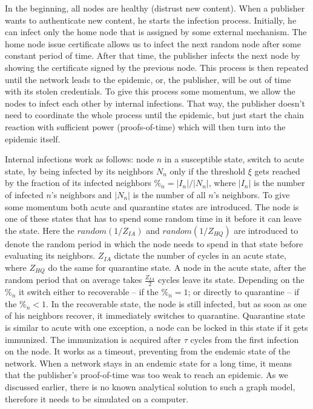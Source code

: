 \documentclass[nostrict]{szablonPG}
\begin{document}
In the beginning, all nodes are healthy (distrust new content). When a publisher wants to authenticate new content, he starts the infection process. Initially, he can infect only the home node that is assigned by some external mechanism. The home node issue certificate allows us to infect the next random node after some constant period of time. After that time, the publisher infects the next node by showing the certificate signed by the previous node. This process is then repeated until the network leads to the epidemic, or, the publisher, will be out of time with its stolen credentials. To give this process some momentum, we allow the nodes to infect each other by internal infections. That way, the publisher doesn't need to coordinate the whole process until the epidemic, but just start the chain reaction with sufficient power (proofs-of-time) which will then turn into the epidemic itself.

Internal infections work as follows: node $n$ in a susceptible state, switch to acute state, by being infected by its neighbors $N_n$ only if the threshold $\xi$ gets reached by the fraction of its infected neighbors $\%_n = |I_n|/|N_n|$, where $|I_n|$ is the number of infected $n$'s neighbors and $|N_n|$ is the number of all $n$'s neighbors. To give some momentum both acute and quarantine states are introduced. The node is one of these states that has to spend some random time in it before it can leave the state. Here the $random(1/Z_{IA})$ and $random(1/Z_{HQ})$ are introduced to denote the random period in which the node needs to spend in that state before evaluating its neighbors. $Z_{IA}$ dictate the number of cycles in an acute state, where $Z_{HQ}$ do the same for quarantine state. A node in the acute state, after the random period that on average takes $\frac{Z_{IA}}{2}$ cycles leave its state. Depending on the $\%_n$ it switch either to recoverable -- if the $\%_n = 1$; or directly to quarantine -- if the $\%_n < 1$. In the recoverable state, the node is still infected, but as soon as one of his neighbors recover, it immediately switches to quarantine. Quarantine state is similar to acute with one exception, a node can be locked in this state if it gets immunized. The immunization is acquired after $\tau$ cycles from the first infection on the node. It works as a timeout, preventing from the endemic state of the network. When a network stays in an endemic state for a long time, it means that the publisher's proof-of-time was too weak to reach an epidemic. As we discussed earlier, there is no known analytical solution to such a graph model, therefore it needs to be simulated on a computer.
\end{document}
